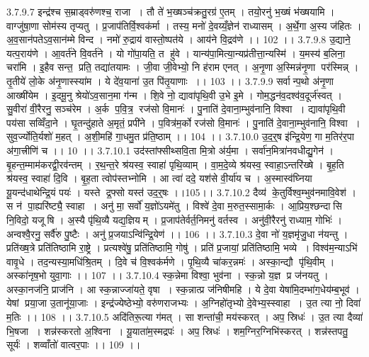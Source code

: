 3.7.9.7
इन्द्र॑श्च स॒म्राड्वरु॑णश्च॒ राजा । तौ ते॑ भ॒ख्षञ्च॑क्रतु॒रग्र॑ ए॒तम् । तयो॒रनु॑ भ॒ख्षं भ॑ख्षयामि । वाग्जु॑षा॒णा सोम॑स्य तृप्यतु । प्र॒जाप॑तिर्वि॒श्वक॑र्मा । तस्य॒ मनो॑ दे॒वय्यँ॒ज्ञेन॑ राध्यासम् । अ॒र्थे॒गा अ॒स्य ज॑हितः । अ॒व॒सान॑पतेऽव॒सान॑म्मे विन्द । नमो॑ रु॒द्राय॑ वास्तो॒ष्पत॑ये । आय॑ने वि॒द्रव॑णे ।। 102 ।।
3.7.9.8
उ॒द्याने॒ यत्प॒राय॑णे । आ॒वर्त॑ने वि॒वर्त॑ने । यो गो॑पा॒यति॒ त हु॑वे । यान्य॑पा॒मित्या॒न्यप्र॑तीत्ता॒न्यस्मि॑ । य॒मस्य॑ ब॒लिना॒ चरा॑मि । इ॒हैव सन्त॒ प्रति॒ तद्या॑तयामः । जी॒वा जी॒वेभ्यो॒ नि ह॑राम एनत् । अ॒नृ॒णा अ॒स्मिन्न॑नृ॒णा पर॑स्मिन्न् । तृ॒तीये॑ लो॒के अ॑नृ॒णास्स्या॑म । ये दे॑व॒याना॑ उ॒त पि॑तृ॒याणाः ।। 103 ।।
3.7.9.9
सर्वान्प॒थो अ॑नृ॒णा आख्षी॑येम । इ॒दमू॒नु श्रेयो॑ऽव॒सान॒मा ग॑न्म । शि॒वे नो॒ द्यावा॑पृथि॒वी उ॒भे इ॒मे । गोम॒द्धन॑व॒दश्व॑व॒दूर्ज॑स्वत् । सु॒वीरा॑ वी॒रैरनु॒ सञ्च॑रेम । अ॒र्क प॒वि॒त्र॒॒ रज॑सो वि॒मानः॑ । पु॒नाति॑ दे॒वाना॒म्भुव॑नानि॒ विश्वा । द्यावा॑पृथि॒वी पय॑सा सव्विँदा॒ने । घृ॒तन्दु॑हाते अ॒मृतं॒ प्रपी॑ने । प॒वित्र॑म॒र्को रज॑सो वि॒मानः॑ । पु॒नाति॑ दे॒वाना॒म्भुव॑नानि॒ विश्वा । सुव॒र्ज्योति॒र्यशो॑ म॒हत् । अ॒शी॒महि॑ गा॒धमु॒त प्र॑ति॒ष्ठाम् ।। 104 ।।
3.7.10.0
उ॒द॒र्॒ष इ॑न्द्रि॒येण॒ गा म॒तिर॑र॒पा अ॑गा॒त्त्रीणि॑ च ।। 10 ।।
3.7.10.1
उद॑स्तांफ्सीथ्सवि॒ता मि॒त्रो अ॑र्य॒मा । सर्वा॑न॒मित्रा॑नवधीद्यु॒गेन॑ । बृ॒हन्त॒म्माम॑करद्वी॒रव॑न्तम् । र॒थ॒न्त॒रे श्र॑यस्व॒ स्वाहा॑ पृथि॒व्याम् । वा॒म॒दे॒व्ये श्र॑यस्व॒ स्वाहा॒ऽन्तरि॑ख्षे । बृ॒ह॒ति श्र॑यस्व॒ स्वाहा॑ दि॒वि । बृ॒ह॒ता त्वोप॑स्तभ्नोमि । आ त्वा॑ ददे॒ यश॑से वी॒र्या॑य च । अ॒स्मास्व॑घ्निया यू॒यन्द॑धाथेन्द्रि॒यं पयः॑ । यस्ते द्र॒फ्सो यस्त॑ उद॒र्॒षः ।।105।।
3.7.10.2
दैव्य॑ के॒तुर्विश्व॒म्भुव॑नमावि॒वेश॑ । स न॑ पा॒ह्यरि॑ष्ट्यै॒ स्वाहा । अनु॑ मा॒ सर्वो॑ य॒ज्ञो॑ऽयमे॑तु । विश्वे॑ दे॒वा म॒रुत॒स्सामा॒र्कः । आ॒प्रिय॒श्छन्दा॑सि नि॒विदो॒ यजू॑षि । अ॒स्यै पृ॑थि॒व्यै यद्य॒ज्ञियम् । प्र॒जाप॑तेर्वर्त॒निमनु॑ वर्तस्व । अनु॑वी॒रैरनु॑ राध्याम॒ गोभिः॑ । अन्वश्वै॒रनु॒ सर्वै॑रु पु॒ष्टैः । अनु॑ प्र॒जयाऽन्वि॑न्द्रि॒येण॑ ।। 106 ।।
3.7.10.3
दे॒वा नो॑ य॒ज्ञमृ॑जु॒धा न॑यन्तु । प्रति॑ख्ष॒त्रे प्रति॑तिष्ठामि रा॒ष्ट्रे । प्रत्यश्वे॑षु॒ प्रति॑तिष्ठामि॒ गोषु॑ । प्रति॑ प्र॒जायां॒ प्रति॑तिष्ठामि॒ भव्ये । विश्व॑म॒न्याऽभि॑ वावृ॒धे । तद॒न्यस्या॒मधि॑श्रि॒तम् । दि॒वे च॑ वि॒श्वक॑र्मणे । पृ॒थि॒व्यै चा॑कर॒न्नमः॑ । अस्का॒न्द्यौ पृ॑थि॒वीम् । अस्का॑नृष॒भो युवा॒गाः ।। 107 ।।
3.7.10.4
स्क॒न्नेमा विश्वा॒ भुव॑ना । स्क॒न्नो य॒ज्ञ प्र ज॑नयतु । अस्का॒नज॑नि॒ प्राज॑नि । आ स्क॒न्नाज्जा॑यते॒ वृषा । स्क॒न्नात्प्र ज॑निषीमहि । ये दे॒वा येषा॑मि॒दम्भा॑ग॒धेय॑म्ब॒भूव॑ । येषां प्रया॒जा उ॒तानू॑या॒जाः । इन्द्र॑ज्येष्ठेभ्यो॒ वरु॑णराजभ्यः । अ॒ग्निहो॑तृभ्यो दे॒वेभ्य॒स्स्वाहा । उ॒त त्या नो॒ दिवा॑ म॒तिः ।। 108 ।।
3.7.10.5
अदि॑तिरू॒त्या ग॑मत् । सा शन्ता॑ची॒ मय॑स्करत् । अप॒ स्रिधः॑ । उ॒त त्या दैव्या॑ भि॒षजा । शन्न॑स्करतो अ॒श्विना । यू॒याता॑म॒स्मद्रपः॑ । अप॒ स्रिधः॑ । शम॒ग्निर॒ग्निभि॑स्करत् । शन्न॑स्तपतु॒ सूर्यः॑ । शव्वाँतो॑ वात्वर॒पाः ।। 109 ।।
